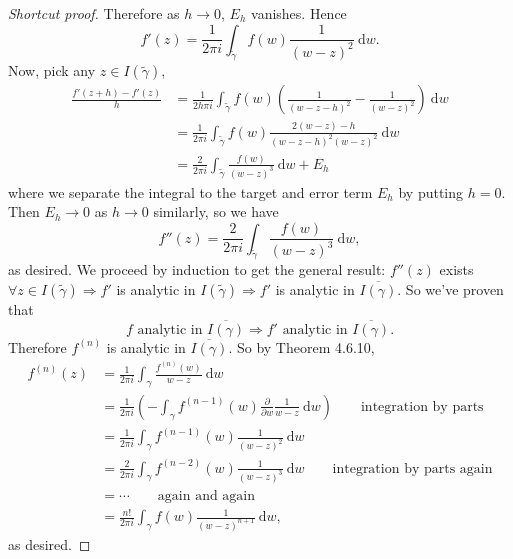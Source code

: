 \documentclass[a4paper]{article}
\theoremstyle{definition}
\begin{document}
\begin{proof}[Shortcut proof]
Therefore as $h\rightarrow 0$, $E_h$ vanishes. Hence
\[
f'(z) = \frac{1}{2\pi i} \int_{\widetilde{\gamma}} f(w) \frac{1}{(w-z)^2} \ \mathrm d w .
\]
Now, pick any $z\in I(\widetilde{\gamma})$,
\[
\begin{aligned}
\frac{f'(z+h)-f'(z)}{h} &= \frac{1}{2h\pi i} \int_{\widetilde{\gamma}} f(w) \left(\frac{1}{(w-z-h)^2}-\frac{1}{(w-z)^2} \right) \ \mathrm d w \\ &=\frac{1}{2\pi i} \int_{\widetilde{\gamma}} f(w) \frac{2(w-z)-h}{(w-z-h)^2(w-z)^2} \ \mathrm d w \\&= \frac{2}{2\pi i} \int_{\widetilde{\gamma}} \frac{f(w)}{(w-z)^3} \ \mathrm d w+E_h
\end{aligned}
\]
where we separate the integral to the target and error term $E_h$ by putting $h=0$. Then $E_h \rightarrow 0$ as $h\rightarrow 0$ similarly, so we have
\[
f''(z) = \frac{2}{2\pi i} \int_{\widetilde{\gamma}} \frac{f(w)}{(w-z)^3} \ \mathrm d w ,
\]
as desired. We proceed by induction to get the general result: $f''(z)$ exists $\forall z\in I(\widetilde{\gamma}) \Rightarrow f'$ is analytic in $I(\widetilde{\gamma}) \Rightarrow f'$ is analytic in $\overline{I(\gamma)}$. So we've proven that
\[
f\text{ analytic in }\overline{I(\gamma)} \Rightarrow f' \text{ analytic in }\overline{I(\gamma)}.
\]
Therefore $f^{(n)}$ is analytic in $\overline{I(\gamma)}$. So by Theorem 4.6.10,
\[
\begin{aligned}
f^{(n)}(z) &= \frac{1}{2\pi i} \int_\gamma \frac{f^{(n)} (w)}{w-z} \ \mathrm d w \\&= \frac{1}{2\pi i} \left(-\int_\gamma f^{(n-1)} (w) \frac{\partial}{\partial w} \frac{1}{w-z} \ \mathrm d w \right) \qquad \text{integration by parts} \\&= \frac{1}{2\pi i} \int_\gamma f^{(n-1)}(w) \frac{1}{(w-z)^2} \ \mathrm d w \\&= \frac{2}{2\pi i} \int_\gamma f^{(n-2)}(w) \frac{1}{(w-z)^3} \ \mathrm d w \qquad \text{integration by parts again} \\&= \cdots \qquad \text{again and again} \\&= \frac{n!}{2\pi i} \int_\gamma f(w)\frac{1}{(w-z)^{n+1}} \ \mathrm d w,
\end{aligned}
\]
as desired.
\end{proof}
\end{document}
